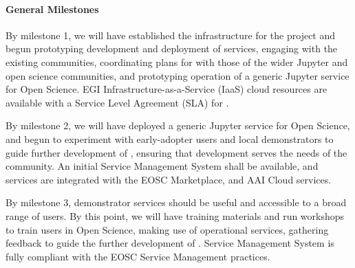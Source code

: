 


\paragraph{General Milestones}

\begin{milestones}
  {
  By milestone 1, we will have established the infrastructure
  for the project and begun prototyping development and deployment of services,
  engaging with the existing communities,
  coordinating plans for \TheProject with those of the wider Jupyter and open science communities,
  and prototyping operation of a generic Jupyter service
  for Open Science.
  EGI Infrastructure-as-a-Service (IaaS) cloud resources are available with a
  Service Level Agreement (SLA) for \TheProject.
  }

  {
  By milestone 2, we will have deployed a generic Jupyter service for Open Science, and begun to experiment with early-adopter
  users and local demonstrators to guide further development of \TheProject,
  ensuring that development serves the needs of the community.
  An initial \TheProject Service Management System shall be available,
  and \TheProject services are integrated with the EOSC Marketplace,
  and AAI Cloud services.
  }

  {
  By milestone 3, demonstrator services should be useful and accessible
  to a broad range of users.
  By this point, we will have training materials and run
  workshops to train users in Open Science,
  making use of operational \TheProject services,
  gathering feedback to guide the further development of \TheProject.
  \TheProject Service Management System is fully compliant with the EOSC Service Management practices.
  }


\end{milestones}
